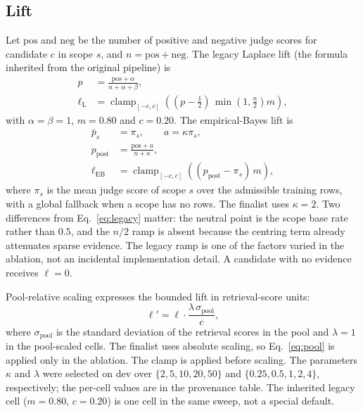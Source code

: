 \documentclass{ieeeaccess}
\begin{document}
\subsection{Lift}
Let $\mathrm{pos}$ and $\mathrm{neg}$ be the number of positive and negative judge
scores for candidate $c$ in scope $s$, and $n=\mathrm{pos}+\mathrm{neg}$. The
legacy Laplace lift (the formula inherited from the original pipeline) is
\begin{equation}
\begin{aligned}
p &= \frac{\mathrm{pos}+\alpha}{n+\alpha+\beta},\\
\ell_{\mathrm{L}} &= \operatorname{clamp}_{[-c,c]}\!\left(
(p-\tfrac12)\,\min\!\left(1,\tfrac{n}{2}\right)m\right),
\end{aligned}
\label{eq:legacy}
\end{equation}
with $\alpha=\beta=1$, $m=0.80$ and $c=0.20$. The empirical-Bayes lift is
\begin{equation}
\begin{aligned}
\bar p_s &= \pi_s,\qquad a=\kappa\pi_s,\\
p_{\mathrm{post}} &= \frac{\mathrm{pos}+a}{n+\kappa},\\
\ell_{\mathrm{EB}} &= \operatorname{clamp}_{[-c,c]}\!\left(
(p_{\mathrm{post}}-\pi_s)\,m\right),
\end{aligned}
\label{eq:eb}
\end{equation}
where $\pi_s$ is the mean judge score of scope $s$ over the admissible training
rows, with a global fallback when a scope has no rows. The finalist uses
$\kappa=2$. Two differences from Eq.~\ref{eq:legacy} matter: the neutral point is
the scope base rate rather than $0.5$, and the $n/2$ ramp is absent because the
centring term already attenuates sparse evidence. The legacy ramp is one of the
factors varied in the ablation, not an incidental implementation detail. A
candidate with no evidence receives $\ell=0$.

Pool-relative scaling expresses the bounded lift in retrieval-score units:
\begin{equation}
\ell'=\ell\cdot\frac{\lambda\,\sigma_{\mathrm{pool}}}{c},
\label{eq:pool}
\end{equation}
where $\sigma_{\mathrm{pool}}$ is the standard deviation of the retrieval scores in
the pool and $\lambda=1$ in the pool-scaled cells. The finalist uses absolute
scaling, so Eq.~\ref{eq:pool} is applied only in the ablation. The clamp is applied
before scaling. The parameters $\kappa$ and $\lambda$ were selected on dev over
$\{2,5,10,20,50\}$ and $\{0.25,0.5,1,2,4\}$, respectively; the per-cell values are
in the provenance table. The inherited legacy cell ($m=0.80$, $c=0.20$) is one
cell in the same sweep, not a special default.
\end{document}

